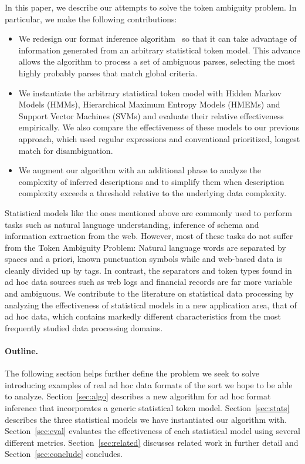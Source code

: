 In this paper, we describe our attempts to solve the token ambiguity problem.
In particular, we make the following contributions:
\begin{itemize}
\item We redesign our format inference algorithm~\cite{fisher+:dirttoshovels} 
so that it can take advantage of information 
generated from an arbitrary statistical token model.
This advance allows the algorithm to process a set of
ambiguous parses, selecting the most highly probably parses that 
match global criteria.
\item We instantiate the arbitrary statistical token model with
Hidden Markov Models (HMMs), Hierarchical Maximum Entropy Models
(HMEMs) and Support Vector Machines (SVMs) and evaluate 
their relative effectiveness empirically.  We also compare the effectiveness of
these models to our previous approach, which used regular expressions
and conventional prioritized, longest match for disambiguation.
\item We augment our algorithm with an additional phase to
analyze the complexity of inferred descriptions and to simplify
them when description complexity exceeds a threshold relative to
the underlying data complexity.
\end{itemize}

Statistical models like the ones mentioned above are commonly
used to perform tasks such as natural language understanding,
inference of \xml{} schema and information extraction from the
web.  However, most of these tasks do not suffer from the
Token Ambiguity Problem:  Natural language words are separated
by spaces and a priori, known punctuation symbols while \xml{} 
and web-based data is cleanly divided up by tags.  In contrast,
the separators and token types found in ad hoc data sources such as
web logs and financial records are far more variable and 
ambiguous.  We contribute to the literature on statistical 
data processing by analyzing the effectiveness of statistical models
in a new application area, that of ad hoc data, which contains 
markedly different characteristics from the most frequently studied
data processing domains.

\paragraph*{Outline.}
The following section helps further define the problem we seek
to solve introducing examples of real ad hoc data formats of the
sort we hope to be able to analyze.  Section~\ref{sec:algo}
describes a new algorithm for ad hoc format inference that
incorporates a generic statistical token model.  Section~\ref{sec:stats}
describes the three statistical models we have instantiated our
algorithm with.  Section~\ref{sec:eval} evaluates the effectiveness
of each statistical model using several different metrics.  
Section~\ref{sec:related} discusses related work in further detail
and Section~\ref{sec:conclude} concludes.